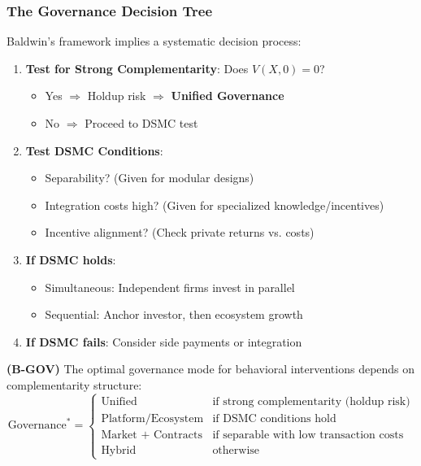 \subsubsection{The Governance Decision Tree}

Baldwin's framework implies a systematic decision process:

\begin{enumerate}
    \item \textbf{Test for Strong Complementarity}: Does $V(X, 0) = 0$?
    \begin{itemize}
        \item Yes $\Rightarrow$ Holdup risk $\Rightarrow$ \textbf{Unified Governance}
        \item No $\Rightarrow$ Proceed to DSMC test
    \end{itemize}
    
    \item \textbf{Test DSMC Conditions}:
    \begin{itemize}
        \item Separability? (Given for modular designs)
        \item Integration costs high? (Given for specialized knowledge/incentives)
        \item Incentive alignment? (Check private returns vs. costs)
    \end{itemize}
    
    \item \textbf{If DSMC holds}:
    \begin{itemize}
        \item Simultaneous: Independent firms invest in parallel
        \item Sequential: Anchor investor, then ecosystem growth
    \end{itemize}
    
    \item \textbf{If DSMC fails}: Consider side payments or integration
\end{enumerate}

\begin{axiom}
\label{ax:B-GOV}
\textbf{(B-GOV)} The optimal governance mode for behavioral interventions depends 
on complementarity structure:
\begin{equation}
\text{Governance}^* = \begin{cases}
\text{Unified} & \text{if strong complementarity (holdup risk)} \\
\text{Platform/Ecosystem} & \text{if DSMC conditions hold} \\
\text{Market + Contracts} & \text{if separable with low transaction costs} \\
\text{Hybrid} & \text{otherwise}
\end{cases}
\end{equation}
\end{axiom}

